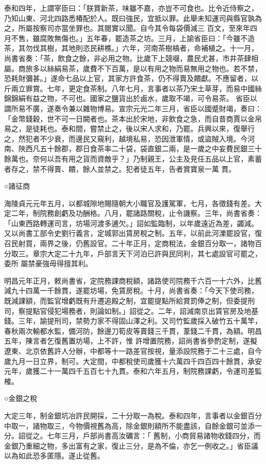 \begin{pinyinscope}
 泰和四年，上謂宰臣曰：「朕賞新茶，味雖不嘉，亦豈不可食也。比令近侍察之，乃知山東、河北四路悉椿配於人。既曰強民，宜抵以罪。此舉未知運司與縣官孰為之，所屬按察司亦當坐罪也。其閱實以聞。自今其令每袋價減三
 百文，至來年四月不售，雖腐敗無傷也。」五年春，罷造茶之坊。三月，上諭省臣曰：「今雖不造茶，其勿伐其樹，其地則恣民耕樵。」六年，河南茶樹槁者，命補植之。十一月，尚書省奏：「茶，飲食之餘，非必用之物。比歲下上競啜，農民尤甚，市井茶肆相屬。商旅多以絲絹易茶，歲費不下百萬，是以有用之物而易無用之物也。若不禁，恐耗財彌甚。」遂命七品以上官，其家方許食茶，仍不得賣及饋獻。不應留者，以斤兩立罪賞。七年，更定食茶制。八年七月，言事者以茶乃宋土草芽，而易中國絲錦錦絹有益之物，不可也。國家之鹽貨出於鹵水，歲取不竭，可令易茶。
 省臣以謂所易不廣，遂奏令兼以雜物博易。宣宗元光二年三月，省臣以國蹙財竭，奏曰：「金幣錢穀，世不可一日闕者也。茶本出於宋地，非飲食之急，而自昔商賈以金帛易之，是徒耗也。泰和間，嘗禁止之，後以宋人求和，乃罷。兵興以來，復舉行之，然犯者不少衰，而邊民又窺利，越境私易，恐因泄軍情，或盜賊入境。今河南、陜西凡五十餘郡，郡日食茶率二十袋，袋直銀二兩，是一歲之中妄費民銀三十餘萬也。奈何以吾有用之貨而資敵乎？」乃制親王，公主及見任五品以上官，素蓄者存之，禁不得賣、饋，餘人並禁之。犯者徒五年，告者賞寶泉一萬
 貫。



 ○諸征商



 海陵貞元元年五月，以都城隙地賜隨朝大小職官及護駕軍，七月，各徵錢有差。大定二年，制院務創虧及功酬格。八月，罷諸路關稅，止令譏察。三年，尚書省奏：「山東西路轉運司言，坊場河渡多逋欠。」詔如監臨制，以年歲遠近為差，蠲減。又以尚書工部令史劉行義言，定城郭出賃房稅之制。五年，以前此河濼罷設官，復召民射買，兩界之後，仍舊設官。二十年正月，定商稅法，金銀百分取一，諸物百分取三。章宗大定二十九年，戶部言天下河泊已許與民同利，其七處設官可罷之，委所
 屬禁豪強毋得擅其利。



 明昌元年正月，敕尚書省，定院務課商稅額，諸路使司院務千六百一十六外，比舊減九十四萬一千餘貫，遂罷坊場，免賃房稅。十月，尚書省奏：「今天下使司務，既減課額，而監官增虧既有升遷追殿之制，宜罷提點所給賞罰俸之制，但委提刑司，察提點官侵犯場務者，則論如制。」詔從之。二年，詔減南京出賃官房及地基錢。三年，諭提刑司，禁勢力家不得固山澤之利。又司竹監歲採入破竹五十萬竿，春秋兩次輸都水監，備河防，餘邊刀筍皮等賣錢三千貫，葦錢二千貫，為額。明昌五年，陳言者乞復舊置坊場，上不許，惟
 許增置院務，詔尚書省參酌定制，遂擬遼東、北京依舊許人分辦，中都等十一路差官按視，量添設院務于二十三處，自今歲九月一日立界，制可。大定間，中都稅使司歲獲十六萬四千四百四十餘貫，承安元年，歲獲二十一萬四千五百七十九貫。泰和六年五月，制院務課虧，令運司差監榷。



 ○金銀之稅



 大定三年，制金銀坑冶許民開採，二十分取一為稅。泰和四年，言事者以金銀百分中取一，諸物取三，今物價視舊為高，除金銀則額所不能盡該，自餘金銀可並添一分。詔從之。七年三月，戶部尚書高汝礪言：「
 舊制，小商貿易諸物收錢四分，而金銀乃重細之物，多出富有之家，復止三分，是為不倫，亦乞一例收之。」省臣議以為如此恐多匿隱。遂止從舊。



\end{pinyinscope}